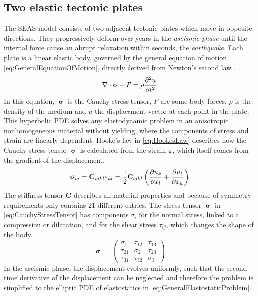 \subsection{Two elastic tectonic plates}
\label{ssec:GeneralSeasModel}
The SEAS model consists of two adjacent tectonic plates which move in opposite directions. They progressively deform over years in the \textit{aseismic phase} until the internal force cause an abrupt relaxation within seconds, the \textit{earthquake}. Each plate is a linear elastic body, governed by the general equation of motion \ref{eq:GeneralEquationOfMotion}, directly derived from Newton's second law \cite{LinearElasticityTheory}.
\begin{equation}
	\label{eq:GeneralEquationOfMotion}
	\nabla \cdot \bm{\upsigma} + F = \rho \pdv[2]{u}{t}
\end{equation}
In this equation, $\bm{\upsigma}$ is the Cauchy stress tensor, $F$ are some body forces, $\rho$ is the density of the medium and $u$ the displacement vector at each point in the plate. This hyperbolic PDE solves any elastodynamic problem in an anisotropic nonhomogeneous material without yielding, where the components of stress and strain are linearly dependent. Hooke's law in \autoref{eq:HookesLaw} describes how the Cauchy stress tensor $\bm{\upsigma}$ is calculated from the strain $\mathbf{\varepsilon}$, which itself comes from the gradient of the displacement. 
\begin{equation}
\label{eq:HookesLaw}
\bm{\upsigma}_{ij} = \mathbf{C}_{ijkl}\mathbf{\varepsilon}_{kl} = \frac{1}{2}\mathbf{C}_{ijkl}\left(\pdv{u_k}{x_l} + \pdv{u_l}{x_k}\right)
\end{equation}
The stiffness tensor $\mathbf{C}$ describes all material properties and because of symmetry requirements only contains 21 different entries. The stress tensor $\bm{\upsigma}$ in \autoref{eq:CauchyStressTensor} has components $\sigma_i$ for the normal stress, linked to a compression or dilatation, and for the shear stress $\tau_{ij}$, which changes the shape of the body. 
\begin{equation}
\label{eq:CauchyStressTensor}
\bm{\upsigma} = \begin{pmatrix}
\sigma_1 & \tau_{12} & \tau_{13} \\ \tau_{21} & \sigma_2 & \tau_{23} \\ \tau_{31} & \tau_{32} & \sigma_3
\end{pmatrix}
\end{equation}
In the aseismic phase, the displacement evolves uniformly, such that the second time derivative of the displacement can be neglected and therefore the problem is simplified to the elliptic PDE of elastostatics in \autoref{eq:GeneralElastostaticProblem}.
